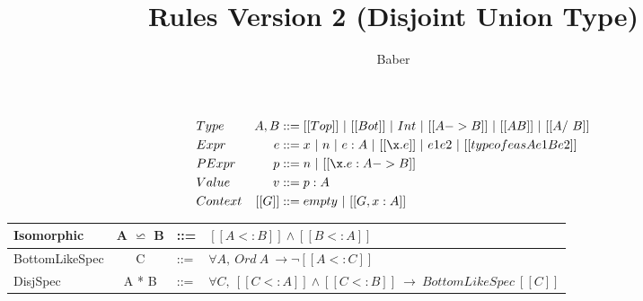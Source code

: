 \documentclass[a4paper]{article}
\title{Rules Version 2 (Disjoint Union Type)}
\author{Baber}
\begin{document}
\maketitle

\begin{align*}
&Type &A, B&::= [[Top]] ~ | ~[[Bot]]~|~ Int ~|~ [[A->B]]~ |~ [[A \/ B]] ~ |~ [[A /\ B]]\\
&Expr &e &::= x ~|~ n ~|~ e:A ~|~[[\x.e]] ~ | ~ e1e2 ~|~ [[typeof e as A e1 B e2]]\\
&PExpr & p &::= n ~|~ [[\x.e : A->B]] \\
&Value &v &::= p : A \\
&Context & [[G]] &::= empty~ |~ [[G , x : A]]
\end{align*}






     {\renewcommand{\arraystretch}{1.5}
     \begin{center}
     \begin{tabular}{|lcll|}
       \hline
      Isomorphic & A $\backsimeq$ B & ::= & $[[A <: B]] \wedge [[B <: A]]$ \\
       \hline
      BottomLikeSpec & C & ::= & $\forall A, ~ Ord ~ A ~ \rightarrow \neg [[A <: C]]$ \\
       \hline
      DisjSpec & A * B & ::= & $\forall C, ~ [[C <: A]] \wedge [[C <: B]] ~ \rightarrow ~ BottomLikeSpec ~ [[C]]$ \\
       \hline
     \end{tabular}
     \end{center} }



\bigskip

\ottdefnsOrdinary

\ottdefnsBottomLike

\ottdefnsDisjointness

\ottdefnsSubtyping

\ottdefnsTyping

\ottdefnsReduction
\end{document}
